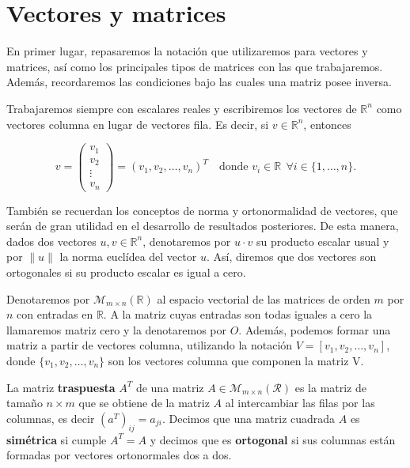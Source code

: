 \section{Vectores y matrices}\label{sec:vectores-matrices}

En primer lugar, repasaremos la notación que utilizaremos para vectores y matrices, así como los principales tipos de matrices con las que trabajaremos. Además, recordaremos las condiciones bajo las cuales una matriz posee inversa.\newline

Trabajaremos siempre con escalares reales y escribiremos los vectores de $\mathbb{R}^{n}$ como vectores columna en lugar de vectores fila. Es decir, si $v \in \mathbb{R}^{n}$, entonces

\[ 
    v = \begin{pmatrix} 
        v_{1} \\ 
        v_{2} \\ 
        \vdots \\
        v_{n}
    \end{pmatrix} = {(v_{1}, v_{2}, \ldots, v_{n})}^{T} \quad \text{donde } v_i \in \mathbb{R} \ \ \forall i \in \{1, \ldots, n \}.
\]

También se recuerdan los conceptos de norma y ortonormalidad de vectores, que serán de gran utilidad en el desarrollo de resultados posteriores. De esta manera, dados dos vectores $u, v \in \mathbb{R}^{n}$, denotaremos por $u \cdot v$ su producto escalar usual y por $\| u \|$ la norma euclídea del vector $u$. Así, diremos que dos vectores son ortogonales si su producto escalar es igual a cero.\newline

Denotaremos por $\mathcal{M}_{m \times n}(\mathbb{R})$ al espacio vectorial de las matrices de orden $m$ por $n$ con entradas en $\mathbb{R}$. A la matriz cuyas entradas son todas iguales a cero la llamaremos matriz cero y la denotaremos por $O$. Además, podemos formar una matriz a partir de vectores columna, utilizando la notación $V = [v_1, v_2, \ldots, v_n]$, donde $\{v_1, v_2, \ldots, v_n\}$ son los vectores columna que componen la matriz V.\newline

\begin{definicion}
    La matriz \textbf{traspuesta} $A^{T}$ de una matriz $A \in \mathcal{M}_{m \times n}(\mathcal{R})$ es la matriz de tamaño $n \times m$ que se obtiene de la matriz $A$ al intercambiar las filas por las columnas, es decir $(a^{T})_{ij} = a_{ji}$. Decimos que una matriz cuadrada $A$ es \textbf{simétrica} si cumple $A^{T} = A$ y decimos que es \textbf{ortogonal} si sus columnas están formadas por vectores ortonormales dos a dos.\newline
\end{definicion}

